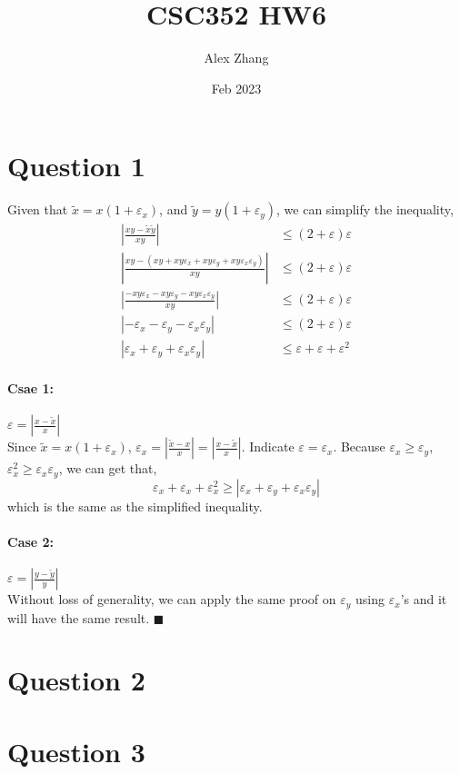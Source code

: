 \documentclass{article}
\title{CSC352 HW6}
\author{Alex Zhang}
\date{Feb 2023}
\begin{document}
\maketitle

\section*{Question 1}
Given that $\tilde{x} = x(1+\varepsilon_x)$, and $\tilde{y} = y(1+\varepsilon_y)$, we can simplify the inequality,
\begin{align}
    \left| \frac{xy-\tilde{x}\tilde{y}}{xy}\right| &\leq (2+\varepsilon)\varepsilon \nonumber \\
    \left| \frac{xy-(xy+xy\varepsilon_x+xy\varepsilon_y+xy\varepsilon_x\varepsilon_y)}{xy}\right| &\leq (2+\varepsilon)\varepsilon \nonumber \\
    \left| \frac{-xy\varepsilon_x-xy\varepsilon_y-xy\varepsilon_x\varepsilon_y}{xy}\right| &\leq (2+\varepsilon)\varepsilon \nonumber \\
    \left| -\varepsilon_x-\varepsilon_y-\varepsilon_x\varepsilon_y\right| &\leq (2+\varepsilon)\varepsilon \nonumber \\
    \left| \varepsilon_x+\varepsilon_y+\varepsilon_x\varepsilon_y\right| &\leq \varepsilon + \varepsilon + \varepsilon^2 \nonumber
\end{align}
\paragraph*{Csae 1:} $\varepsilon = \left|\frac{x-\tilde{x}}{x}\right|$\\
Since $\tilde{x} = x(1+\varepsilon_x)$, $\varepsilon_x = \left|\frac{\tilde{x}-x}{x}\right| =  \left|\frac{x-\tilde{x}}{x}\right| $. Indicate
$\varepsilon = \varepsilon_x$. Because $\varepsilon_x \geq \varepsilon_y$, $\varepsilon_x^2 \geq \varepsilon_x \varepsilon_y$, we can get that,
$$\varepsilon_x + \varepsilon_x + \varepsilon_x^2 \geq \left| \varepsilon_x+\varepsilon_y+\varepsilon_x\varepsilon_y\right| $$
which is the same as the simplified inequality.

\paragraph*{Case 2:} $\varepsilon = \left|\frac{y-\tilde{y}}{y}\right|$\\
Without loss of generality, we can apply the same proof on $\varepsilon_y$ using $\varepsilon_x$'s and it will have the same result. $\blacksquare$



\section*{Question 2}


\section*{Question 3}
\end{document}
